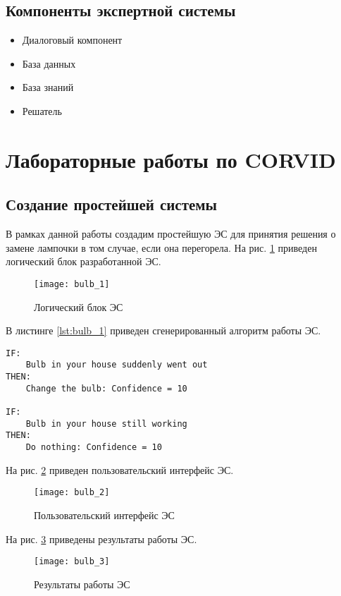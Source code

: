 \subsection{Компоненты экспертной системы}

\begin{itemize}
	\item Диалоговый компонент
	\item База данных
	\item База знаний
	\item Решатель
\end{itemize}

\section{Лабораторные работы по CORVID}

\subsection{Создание простейшей системы}

В рамках данной работы создадим простейшую ЭС для принятия решения о замене лампочки в том случае, если она перегорела. На рис. \ref{fig:bulb_1} приведен логический блок разработанной ЭС.

\begin{figure}[H]
	\centering
	\texttt{[image: bulb\_1]}
	\caption{Логический блок ЭС}
	\label{fig:bulb_1}
\end{figure}

В листинге \ref{lst:bulb_1} приведен сгенерированный алгоритм работы ЭС.

\begin{lstlisting}[label=lst:bulb_1, caption={Алгоритм работы ЭС}]
IF:
	Bulb in your house suddenly went out
THEN:
	Change the bulb: Confidence = 10

IF:
	Bulb in your house still working
THEN:
	Do nothing: Confidence = 10
\end{lstlisting}

На рис. \ref{fig:bulb_2} приведен пользовательский интерфейс ЭС.

\begin{figure}[H]
	\centering
	\texttt{[image: bulb\_2]}
	\caption{Пользовательский интерфейс ЭС}
	\label{fig:bulb_2}
\end{figure}

На рис. \ref{fig:bulb_3} приведены результаты работы ЭС.

\begin{figure}[H]
	\centering
	\texttt{[image: bulb\_3]}
	\caption{Результаты работы ЭС}
	\label{fig:bulb_3}
\end{figure}

